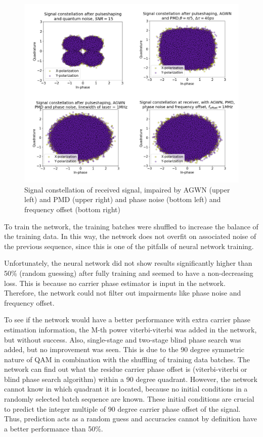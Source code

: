 \documentclass[journal,10pt,twoside, a4paper]{IEEEtran}
\begin{document}
\begin{figure}
    \centering
    \includegraphics[width=\linewidth]{Thesis/images/impairments.jpg}
    \caption{Signal constellation of received signal, impaired by AGWN (upper left) and PMD (upper right) and phase noise (bottom left) and frequency offset (bottom right)}
    \label{fig:impairments}
\end{figure}

To train the network, the training batches were shuffled to increase the balance of the training data. In this way, the network does not overfit on associated noise of the previous sequence, since this is one of the pitfalls of neural network training.

Unfortunately, the neural network did not show results significantly higher than 50\% (random guessing) after fully training and seemed to have a non-decreasing loss. This is because no carrier phase estimator is input in the network. Therefore, the network could not filter out impairments like phase noise and frequency offset.

To see if the network would have a better performance with extra carrier phase estimation information, the M-th power viterbi-viterbi was added in the network, but without success. Also, single-stage and two-stage blind phase search was added, but no improvement was seen. This is due to the 90 degree symmetric nature of QAM in combination with the shuffling of training data batches. The network can find out what the residue carrier phase offset is (viterbi-viterbi or blind phase search algorithm) within a 90 degree quadrant. However, the network cannot know in which quadrant it is located, because no initial conditions in a randomly selected batch sequence are known. These initial conditions are crucial to predict the integer multiple of 90 degree carrier phase offset of the signal. Thus, prediction acts as a random guess and accuracies cannot by definition have a better performance than 50\%. 
\end{document}
